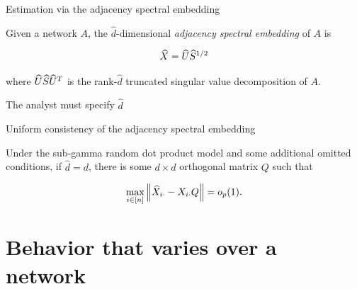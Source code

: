 \documentclass{beamer}
\theoremstyle{remark}
\begin{document}
\begin{frame}{Estimation via the adjacency spectral embedding}


    \begin{definition}[ASE]

        Given a network $A$, the $\widehat{d}$-dimensional \emph{adjacency spectral embedding} of $A$ is

        \begin{align*}
            \widehat{X} = \widehat{U} \widehat{S}^{1/2}
        \end{align*}

        \noindent where $\widehat{U} \widehat{S} \widehat{U}^T$ is the rank-$\widehat{d}$ truncated singular value decomposition of $A$.

    \end{definition}

    The analyst must specify $\widehat{d}$

\end{frame}

\begin{frame}{Uniform consistency of the adjacency spectral embedding}

    \begin{lemma}

        Under the sub-gamma random dot product model and some additional omitted conditions, if $\widehat{d} = d$, there is some $d \times d$ orthogonal matrix $Q$ such that

        \begin{equation*}
            \max_{i \in [n]} \, \norm*{\Xhat_{i \cdot} - \X_{i \cdot} Q} = \op{1}.
        \end{equation*}

    \end{lemma}

\end{frame}

\section{Behavior that varies over a network}
\end{document}
